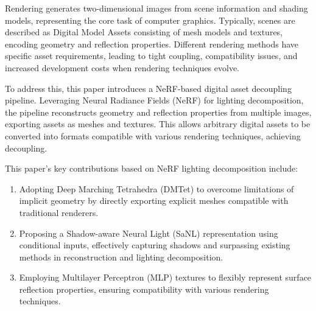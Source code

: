 \begin{abstract*}

  Rendering generates two-dimensional images from scene information and shading models, 
  representing the core task of computer graphics. Typically, 
  scenes are described as Digital Model Assets consisting of mesh models and textures, 
  encoding geometry and reflection properties. Different rendering methods have specific asset requirements, 
  leading to tight coupling, compatibility issues, and increased development costs when rendering techniques evolve.

  To address this, this paper introduces a NeRF-based digital asset decoupling pipeline. 
  Leveraging Neural Radiance Fields (NeRF) for lighting decomposition, 
  the pipeline reconstructs geometry and reflection properties from multiple images, 
  exporting assets as meshes and textures. 
  This allows arbitrary digital assets to be converted into formats compatible with various rendering techniques, 
  achieving decoupling.
  
  This paper's key contributions based on NeRF lighting decomposition include:
  
  \begin{enumerate}
  \item Adopting Deep Marching Tetrahedra (DMTet) to overcome limitations of implicit geometry by directly exporting explicit meshes compatible with traditional renderers.
  \item Proposing a Shadow-aware Neural Light (SaNL) representation using conditional inputs, effectively capturing shadows and surpassing existing methods in reconstruction and lighting decomposition.
  \item Employing Multilayer Perceptron (MLP) textures to flexibly represent surface reflection properties, ensuring compatibility with various rendering techniques.
  \end{enumerate}
  
\end{abstract*}
